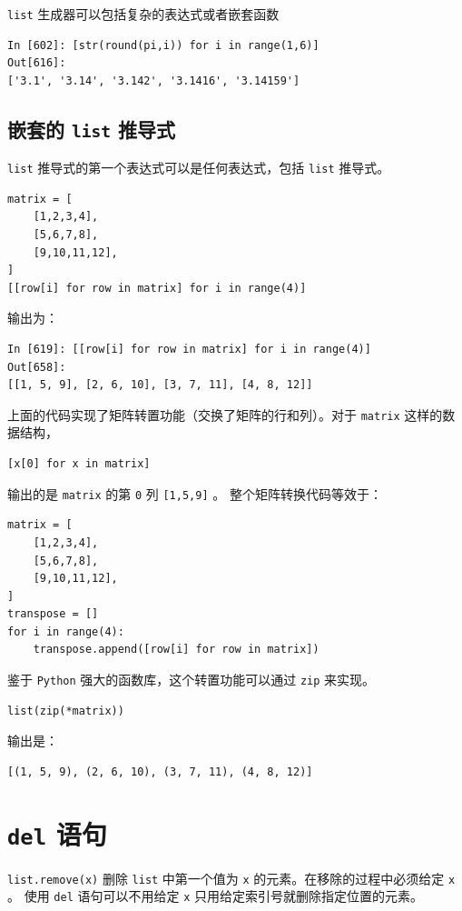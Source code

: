 \documentclass[10pt,a4paper,UTF8]{article}
\begin{document}
\texttt{list} 生成器可以包括复杂的表达式或者嵌套函数

\begin{verbatim}
In [602]: [str(round(pi,i)) for i in range(1,6)]
Out[616]: 
['3.1', '3.14', '3.142', '3.1416', '3.14159']
\end{verbatim}
\subsection{嵌套的 \texttt{list} 推导式}
\label{sec:orgd2b4013}


\texttt{list} 推导式的第一个表达式可以是任何表达式，包括 \texttt{list} 推导式。
\lstset{language=Python,label= ,caption= ,captionpos=b,numbers=none}
\begin{lstlisting}
matrix = [
    [1,2,3,4],
    [5,6,7,8],
    [9,10,11,12],
]
[[row[i] for row in matrix] for i in range(4)]
\end{lstlisting}
输出为：
\begin{verbatim}
In [619]: [[row[i] for row in matrix] for i in range(4)]
Out[658]: 
[[1, 5, 9], [2, 6, 10], [3, 7, 11], [4, 8, 12]]
\end{verbatim}
上面的代码实现了矩阵转置功能（交换了矩阵的行和列）。对于 \texttt{matrix} 这样的数据结构，
\begin{verbatim}
[x[0] for x in matrix]
\end{verbatim}
输出的是 \texttt{matrix} 的第 \texttt{0} 列 \texttt{[1,5,9]} 。
整个矩阵转换代码等效于：
\lstset{language=Python,label= ,caption= ,captionpos=b,numbers=none}
\begin{lstlisting}
matrix = [
    [1,2,3,4],
    [5,6,7,8],
    [9,10,11,12],
]
transpose = []
for i in range(4):
    transpose.append([row[i] for row in matrix])
\end{lstlisting}
鉴于 \texttt{Python} 强大的函数库，这个转置功能可以通过 \texttt{zip} 来实现。
\begin{verbatim}
list(zip(*matrix))
\end{verbatim}
输出是：
\begin{verbatim}
[(1, 5, 9), (2, 6, 10), (3, 7, 11), (4, 8, 12)]
\end{verbatim}
\section{\texttt{del} 语句}
\label{sec:org27dc559}


\texttt{list.remove(x)} 删除 \texttt{list} 中第一个值为 \texttt{x} 的元素。在移除的过程中必须给定 \texttt{x} 。  使用 \texttt{del} 语句可以不用给定 \texttt{x} 只用给定索引号就删除指定位置的元素。
\end{document}
